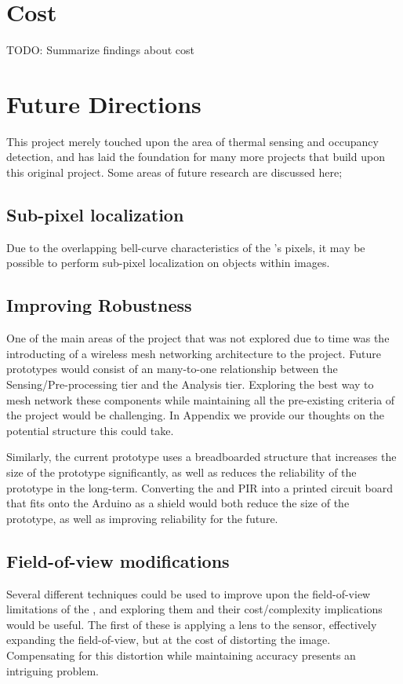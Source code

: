 \documentclass[../thesis/thesis.tex]{subfiles}
\begin{document}
\section{Cost}
TODO: Summarize findings about cost

\section{Future Directions}
This project merely touched upon the area of thermal sensing and occupancy detection, and has laid the foundation for many more projects that build upon this original project. Some areas of future research are discussed here;

\subsection{Sub-pixel localization}
Due to the overlapping bell-curve characteristics of the \mlx's pixels, it may be possible to perform sub-pixel localization on objects within images. %

\subsection{Improving Robustness}
One of the main areas of the project that was not explored due to time was the introducting of a wireless mesh networking architecture to the project. Future prototypes would consist of an many-to-one relationship between the Sensing/Pre-processing tier and the Analysis tier. Exploring the best way to mesh network these components while maintaining all the pre-existing criteria of the project would be challenging. In Appendix  we provide our thoughts on the potential structure this could take.

Similarly, the current prototype uses a breadboarded structure that increases the size of the prototype significantly, as well as reduces the reliability of the prototype in the long-term. Converting the \mlx and PIR into a printed circuit board that fits onto the Arduino as a shield would both reduce the size of the prototype, as well as improving reliability for the future.

\subsection{Field-of-view modifications}
Several different techniques could be used to improve upon the field-of-view limitations of the \mlx, and exploring them and their cost/complexity implications would be useful. The first of these is applying a lens to the sensor, effectively expanding the field-of-view, but at the cost of distorting the image. Compensating for this distortion while maintaining accuracy presents an intriguing problem.
\end{document}
